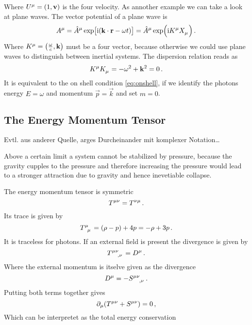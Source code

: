 Where $\tensor{U}{^\mu}=(1,\vec{v})$ is the four velocity. As annother example
we can take a look at plane waves. The vector potential of a plane wave is
\begin{equation}
\tensor{A}{^\mu}=\tensor{\hat{A}}{^\mu}
\exp\left[\imI(\vec{k}\cdot\vec{r}-\omega
t)\right]
=\tensor{\hat{A}}{^\mu}\exp\left(\imI\tensor{K}{^\mu} \tensor{X}{_\mu}\right)\,
.
\end{equation}
Where $\tensor{K}{^\mu}=\left(\frac{\omega}{c},\vec{k}\right)$ must be a four
vector, because otherwise we could use plane waves to distinguish between
inertial systems. The dispersion relation reads as
\begin{equation}
\tensor{K}{^\mu}\tensor{K}{_\mu}=-\omega^2+\vec{k}^2=0\, .
\end{equation}
It is equivalent to the on shell condition \eqref{eq:onshell}, if we identify
the photons energy $E=\omega$ and momentum $\vec{p}=\vec{k}$ and set
$m=0$.
\subsection{The Energy Momentum Tensor}
Evtl. aus anderer Quelle, arges Durcheinander mit komplexer Notation\ldots
\begin{sidenote}
Above a certain limit a system cannot be stabilized by pressure, because the
gravity cupples to the pressure and therefore increasing the pressure would lead
to a stronger attraction due to gravity and hence inevetiable collapse.
\end{sidenote}
The energy momentum tensor is symmetric 
\begin{equation}
\tensor{T}{^\mu^\nu}=\tensor{T}{^\nu^\mu}\, .
\end{equation}
Its trace is given by
\begin{equation}
\tensor{T}{^\mu_\mu}=(\rho-p)+4p=-\rho+3p\, .
\end{equation}
It is traceless for photons. If an external field is present the divergence is
given by
\begin{equation}
\tensor{T}{^\mu^\nu_,_\nu}=\tensor{D}{^\mu}\,  .
\end{equation}
Where the external momentum is itselve given as the divergence 
\begin{equation}
\tensor{D}{^\mu} =-\tensor{S}{^\mu^\nu_,_\nu}\, . 
\end{equation}
Putting both terms together gives
\begin{equation}
\partial_\mu(\tensor{T}{^\mu^\nu}+\tensor{S}{^\mu^\nu})=0\,,
\end{equation}
Which can be interpretet as the total energy conservation
